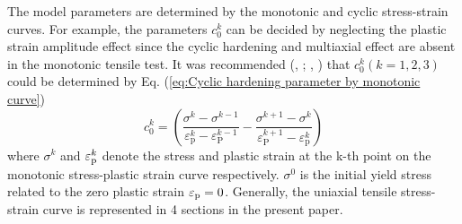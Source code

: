 \documentclass[final,5p,times,onecolumn,10pt,sort&compress]{elsarticle}
\begin{document}
The model parameters are determined by the monotonic and cyclic stress-strain curves. For example, the parameters $c_{0}^{k}$ can be decided by neglecting the plastic strain amplitude effect since the cyclic hardening and multiaxial effect are absent in the monotonic tensile test. It was recommended (\citeauthor{Jiang1996Characteristics}, \citeyear{Jiang1996Characteristics}; \citeauthor{Jiang1996Modeling}, \citeyear{Jiang1996Modeling}) that $c_{0}^{k}\left  ( k=1,2,3 \right )$ could be determined by Eq. (\ref{eq:Cyclic hardening parameter by monotonic curve})
\begin{equation}\label{eq:Cyclic hardening parameter by monotonic curve}
c_{0}^{k}=\left (\frac{\sigma^{k}-\sigma^{k-1}}{\varepsilon_{\mathrm{p}}^{k}-\varepsilon_{\mathrm{P}}^{k-1}}
-\frac{\sigma^{k+1}-\sigma^{k}}{\varepsilon_{\mathrm{P}}^{k+1}-\varepsilon_{\mathrm{p}}^{k}}\right)
\end{equation}
where $\sigma^{k}$ and $\varepsilon_{\rm p}^{k}$ denote the stress and plastic strain at the k-th point on the monotonic stress-plastic strain curve respectively. $\sigma^{0}$ is the initial yield stress related to the zero plastic strain $\varepsilon_{\rm p} = 0$. Generally, the uniaxial tensile stress-strain curve is represented in 4 sections in the present paper.
\end{document}
